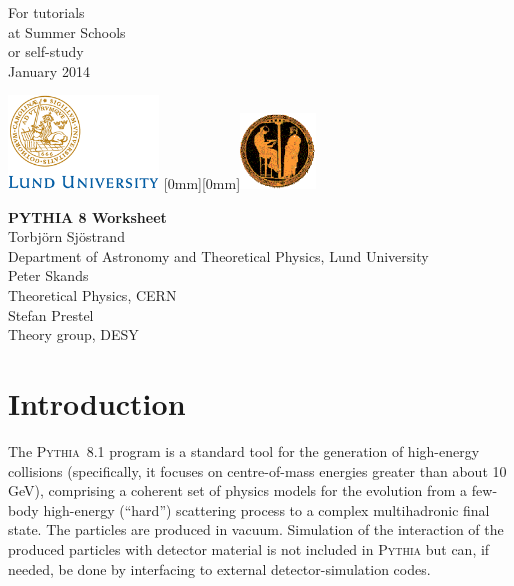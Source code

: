 \documentclass[12pt,a4paper]{article}
\begin{document}
 
\sloppy

\begin{flushright}
For tutorials\\
at Summer Schools\\
or self-study\\
January 2014
\end{flushright}

\vspace{-28mm}
\includegraphics[width=40mm]{lejon2.eps}%
\hspace{30mm}%
\raisebox{4mm}[0mm][0mm]{\includegraphics[width=20mm]{pythiapicture.eps}}

\begin{center}
{\LARGE\bf PYTHIA 8 Worksheet}\\[10mm]
{\large Torbj\"orn Sj\"ostrand}\\[1mm]
Department of Astronomy and Theoretical Physics, Lund University\\[4mm]
{\large Peter Skands}\\[1mm]
Theoretical Physics, CERN\\[4mm]
{\large Stefan Prestel}\\[1mm]
Theory group, DESY
\end{center}

\vspace*{5mm}

\section{Introduction}

The \textsc{Pythia}~8.1 program is a standard tool for the generation of
high-energy collisions (specifically, it focuses on centre-of-mass
energies greater than about 10 GeV), comprising a coherent set of
physics models for the evolution from a few-body high-energy (``hard'')
scattering process to a complex multihadronic final state. The
particles are produced in vacuum. Simulation of the interaction of the
produced particles with detector material is not included in
\textsc{Pythia} but can, if needed, be done by interfacing to external 
detector-simulation codes.
\end{document}
